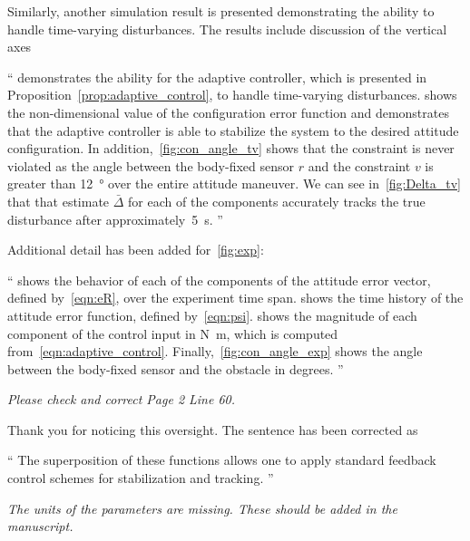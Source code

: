 \documentclass[11pt]{article}
\newenvironment{correction}{\begin{list}{}{\setlength{\leftmargin}{1cm}\setlength{\rightmargin}{1cm}}\vspace{\parsep}\item[]``}{''\end{list}}
\begin{document}
\begin{enumerate}
Similarly, another simulation result is presented demonstrating the ability to handle time-varying disturbances. 
The results include discussion of the vertical axes
\begin{correction}
     demonstrates the ability for the adaptive controller, which is presented in Proposition~\ref{prop:adaptive_control}, to handle time-varying disturbances.
     shows the non-dimensional value of the configuration error function and demonstrates that the adaptive controller is able to stabilize the system to the desired attitude configuration.
    In addition,~\cref{fig:con_angle_tv} shows that the constraint is never violated as the angle between the body-fixed sensor \( r \) and the constraint \( v \) is greater than \SI{12}{\degree} over the entire attitude maneuver.
    We can see in~\cref{fig:Delta_tv} that that estimate \(\bar \Delta \) for each of the components accurately tracks the true disturbance after approximately~\SI{5}{\second}.
\end{correction}
Additional detail has been added for~\cref{fig:exp}:
\begin{correction}
     shows the behavior of each of the components of the attitude error vector, defined by~\cref{eqn:eR}, over the experiment time span.
     shows the time history of the attitude error function, defined by~\cref{eqn:psi}.
     shows the magnitude of each component of the control input in \si{\newton\meter}, which is computed from~\cref{eqn:adaptive_control}.
    Finally,~\cref{fig:con_angle_exp} shows the angle between the body-fixed sensor and the obstacle in degrees.
\end{correction}
\item \textit{Please check and correct Page 2 Line 60.}

Thank you for noticing this oversight. 
The sentence has been corrected as
\begin{correction}
    The superposition of these functions allows one to apply standard feedback control schemes for stabilization and tracking.
\end{correction}

\item \textit{The units of the parameters are missing. These should be added in the manuscript.}


\end{enumerate}
\end{document}
